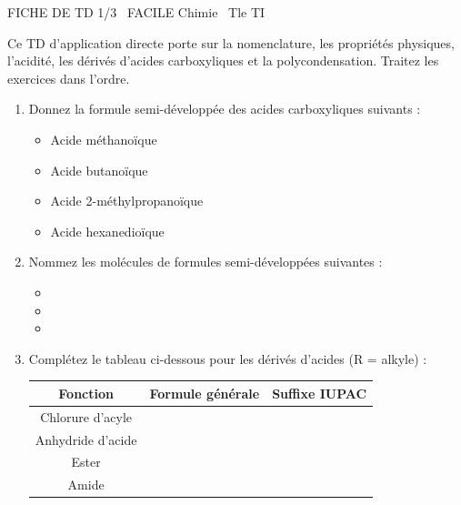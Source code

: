 \documentclass[11pt]{article}
\begin{document}
\begin{tcolorbox}[enhanced,colback=popink,colframe=popink,arc=10pt,boxrule=0pt,left=12pt,right=12pt,top=9pt,bottom=9pt]
{\color{white}\popxbold\small FICHE DE TD 1/3 \textbullet\ FACILE \hfill Chimie \textbullet\ Tle TI\par}
\end{tcolorbox}
\vspace{4pt}
\noindent Ce TD d'application directe porte sur la nomenclature, les propriétés physiques, l'acidité, les dérivés d'acides carboxyliques et la polycondensation. Traitez les exercices dans l'ordre.

\begin{exercice}
\begin{enumerate}
    \item Donnez la formule semi-développée des acides carboxyliques suivants : 
    \begin{itemize}
        \item Acide méthanoïque
        \item Acide butanoïque
        \item Acide 2-méthylpropanoïque
        \item Acide hexanedioïque
    \end{itemize}
    \item Nommez les molécules de formules semi-développées suivantes :
    \begin{itemize}
        \item {}
        \item {}
        \item {}
    \end{itemize}
    \item Complétez le tableau ci-dessous pour les dérivés d'acides (R = alkyle) :
    \begin{center}
    \begin{tabular}{|c|c|c|}
    \hline
    \textbf{Fonction} & \textbf{Formule générale} & \textbf{Suffixe IUPAC} \\
    \hline
    Chlorure d'acyle &  &  \\
    \hline
    Anhydride d'acide &  &  \\
    \hline
    Ester &  &  \\
    \hline
    Amide &  &  \\
    \hline
    \end{tabular}
    \end{center}
\end{enumerate}
\end{exercice}
\end{document}
